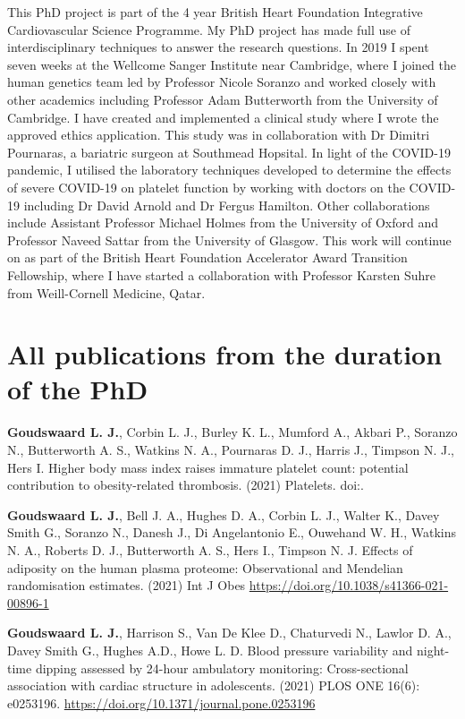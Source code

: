 \documentclass[11pt,twoside]{bristolthesis}
\begin{document}
This PhD project is part of the 4 year British Heart Foundation Integrative Cardiovascular Science Programme. My PhD project has made full use of interdisciplinary techniques to answer the research questions. In 2019 I spent seven weeks at the Wellcome Sanger Institute near Cambridge, where I joined the human genetics team led by Professor Nicole Soranzo and worked closely with other academics including Professor Adam Butterworth from the University of Cambridge. I have created and implemented a clinical study where I wrote the approved ethics application. This study was in collaboration with Dr Dimitri Pournaras, a bariatric surgeon at Southmead Hopsital. In light of the COVID-19 pandemic, I utilised the laboratory techniques developed to determine the effects of severe COVID-19 on platelet function by working with doctors on the COVID-19 including Dr David Arnold and Dr Fergus Hamilton. Other collaborations include Assistant Professor Michael Holmes from the University of Oxford and Professor Naveed Sattar from the University of Glasgow. This work will continue on as part of the British Heart Foundation Accelerator Award Transition Fellowship, where I have started a collaboration with Professor Karsten Suhre from Weill-Cornell Medicine, Qatar.

\hypertarget{all-publications-from-the-duration-of-the-phd}{%
\section{All publications from the duration of the PhD}\label{all-publications-from-the-duration-of-the-phd}}

\textbf{Goudswaard L. J.}, Corbin L. J., Burley K. L., Mumford A., Akbari P., Soranzo N., Butterworth A. S., Watkins N. A., Pournaras D. J., Harris J., Timpson N. J., Hers I. Higher body mass index raises immature platelet count: potential contribution to obesity-related thrombosis. (2021) Platelets. doi:.

\textbf{Goudswaard L. J.}, Bell J. A., Hughes D. A., Corbin L. J., Walter K., Davey Smith G., Soranzo N., Danesh J., Di Angelantonio E., Ouwehand W. H., Watkins N. A., Roberts D. J., Butterworth A. S., Hers I., Timpson N. J. Effects of adiposity on the human plasma proteome: Observational and Mendelian randomisation estimates. (2021) Int J Obes \url{https://doi.org/10.1038/s41366-021-00896-1}

\textbf{Goudswaard L. J.}, Harrison S., Van De Klee D., Chaturvedi N., Lawlor D. A., Davey Smith G., Hughes A.D., Howe L. D. Blood pressure variability and night-time dipping assessed by 24-hour ambulatory monitoring: Cross-sectional association with cardiac structure in adolescents. (2021) PLOS ONE 16(6): e0253196. \url{https://doi.org/10.1371/journal.pone.0253196}
\end{document}
